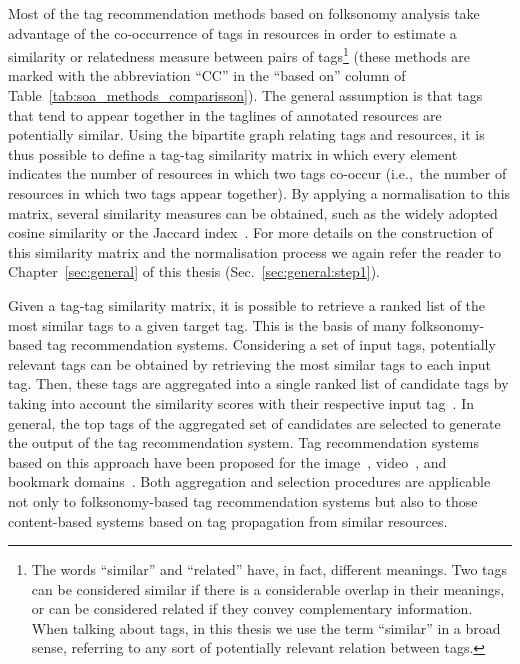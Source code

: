 Most of the tag recommendation methods based on folksonomy analysis take advantage of the co-occurrence of tags in resources in order to estimate a similarity or relatedness measure between pairs of tags\footnote{The words ``similar'' and ``related'' have, in fact, different meanings. Two tags can be considered similar if there is a considerable overlap in their meanings, or can be considered related if they convey complementary information. When talking about tags, in this thesis we use the term ``similar'' in a broad sense, referring to any sort of potentially relevant relation between tags.} (these methods are marked with the abbreviation ``CC'' in the ``based on'' column of Table~\ref{tab:soa_methods_comparisson}).
The general assumption is that tags that tend to appear together in the taglines of annotated resources are potentially similar. Using the bipartite graph relating tags and resources, it is thus possible to define a tag-tag similarity matrix in which every element indicates the number of resources in which two tags co-occur (i.e.,~the number of resources in which two tags appear together).
By applying a normalisation to this matrix, several similarity measures can be obtained, such as the widely adopted cosine similarity or the Jaccard index~\citep{Mika2007a,Markines2009}. For more details on the construction of this similarity matrix and the normalisation process we again refer the reader to Chapter~\ref{sec:general} of this thesis (Sec.~\ref{sec:general:step1}).

Given a tag-tag similarity matrix, it is possible to retrieve a ranked list of the most similar tags to a given target tag.
This is the basis of many folksonomy-based tag recommendation systems. Considering a set of input tags, potentially relevant tags can be obtained by retrieving the most similar tags to each input tag. %
Then, these tags are aggregated into a single ranked list of candidate tags by taking into account the similarity scores with their respective input tag~\citep{Sigurbjornsson2008}. 
In general, the top tags of the aggregated set of candidates are selected to generate the output of the tag recommendation system.
Tag recommendation systems based on this approach have been proposed for the image~\citep{Anderson2008,Sigurbjornsson2008,Garg2008,Wu2009,Liu2010a,Rae2010}, video~\citep{Ballan2010}, and bookmark domains~\citep{Lipczak2008,Song2008,Cao2009,meo2009,Zhang2009}.
Both aggregation and selection procedures are applicable not only to folksonomy-based tag recommendation systems but also to those content-based systems based on tag propagation from similar resources.

